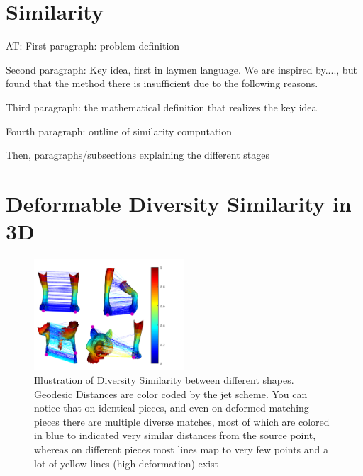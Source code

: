\documentclass[10pt,twocolumn,letterpaper]{article}
\newcommand{\colornote}[3]{{\color{#1}\bf{#2: #3}\normalfont}}
\newcommand{\colornote}[3]{}
\newcommand {\ayellet}[1]{\colornote{blue}{AT}{#1}}
\begin{document}
\section{Similarity}
\ayellet{
First paragraph: problem definition

Second paragraph: Key idea, first in laymen language.
We are inspired by...., but found that the method there is insufficient due to the following reasons.

Third paragraph: the mathematical definition that realizes the key idea

Fourth paragraph: outline of similarity computation

Then, paragraphs/subsections explaining the different stages
}

\section{Deformable Diversity Similarity in 3D}
\begin{figure}[htb]
	
	\includegraphics[width=0.5\textwidth]{figures/DDIS2.png}
	\caption{Illustration of Diversity Similarity between different shapes. 
		Geodesic Distances are color coded by the jet scheme. 
		You can notice that on identical pieces, and even on deformed matching pieces there are multiple diverse matches, most of which are colored in blue to indicated very similar distances from the source point, whereas on different pieces most lines map to very few points and a lot of yellow lines (high deformation) exist}
\end{figure}
\end{document}
